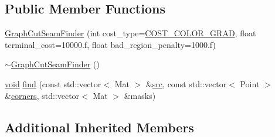 \subsection*{Public Member Functions}
\begin{DoxyCompactItemize}
\item 
\hyperlink{classcv_1_1detail_1_1GraphCutSeamFinder_a35191986128771a43662f02a25b0174a}{Graph\-Cut\-Seam\-Finder} (int cost\-\_\-type=\hyperlink{classcv_1_1detail_1_1GraphCutSeamFinderBase_a322bf4a47a9cc71cfdd8ff65971f07c3a4e0af02eed7c3f02976244dc832e0e81}{C\-O\-S\-T\-\_\-\-C\-O\-L\-O\-R\-\_\-\-G\-R\-A\-D}, float terminal\-\_\-cost=10000.f, float bad\-\_\-region\-\_\-penalty=1000.f)
\item 
\hyperlink{classcv_1_1detail_1_1GraphCutSeamFinder_a3b3d3a8389535c42a89c357b8e81829c}{$\sim$\-Graph\-Cut\-Seam\-Finder} ()
\item 
\hyperlink{legacy_8hpp_a8bb47f092d473522721002c86c13b94e}{void} \hyperlink{classcv_1_1detail_1_1GraphCutSeamFinder_a9c359f0f4340bd745636b5eaaf86c7c8}{find} (const std\-::vector$<$ Mat $>$ \&\hyperlink{legacy_8hpp_a371cd109b74033bc4366f584edd3dacc}{src}, const std\-::vector$<$ Point $>$ \&\hyperlink{imgproc__c_8h_a223e965e192c7025d6c6be77305f515b}{corners}, std\-::vector$<$ Mat $>$ \&masks)
\end{DoxyCompactItemize}
\subsection*{Additional Inherited Members}


